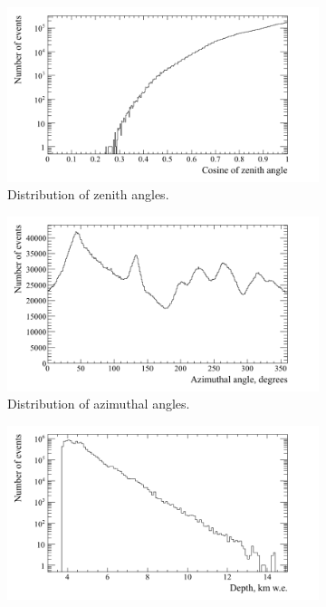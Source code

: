 \begin{figure}[h!]
  \centering
  \begin{subfigure}{0.45\textwidth}
    \centering
    \includegraphics[width=\textwidth]{ZenithCan}
    \caption{Distribution of zenith angles.}
  \end{subfigure}
  \hspace{0.08\textwidth}
  \begin{subfigure}{0.45\textwidth}
    \centering
    \includegraphics[width=\textwidth]{AzimuthCan}
    \caption{Distribution of azimuthal angles.}
  \end{subfigure}
  \begin{subfigure}{0.45\textwidth}
    \centering
    \includegraphics[width=\textwidth]{DepthCan}

\end{subfigure}
\end{figure}
